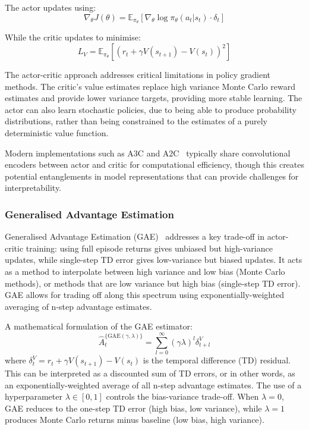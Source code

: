 The actor updates using:
\[
\nabla_\theta J(\theta) = \mathbb{E}_{\pi_\theta}[\nabla_\theta \log \pi_\theta(a_t|s_t) \cdot \delta_t]
\]

While the critic updates to minimise:
\[
L_V = \mathbb{E}_{\pi_\theta}[(r_t + \gamma V(s_{t+1}) - V(s_t))^2]
\]

The actor-critic approach addresses critical limitations in policy gradient methods. The critic's value estimates replace high variance Monte Carlo reward estimates and provide lower variance targets, providing more stable learning. The actor can also learn stochastic policies, due to being able to produce probability distributions, rather than being constrained to the estimates of a purely deterministic value function.

Modern implementations such as A3C and A2C~\citep{mnih_2016_asynchronous} typically share convolutional encoders between actor and critic for computational efficiency, though this creates potential entanglements in model representations that can provide challenges for interpretability.


\subsubsection{Generalised Advantage Estimation}\label{subsubsec:gae}
Generalised Advantage Estimation (GAE)~\citep{schulman_2018_highdimensional} addresses a key trade-off in actor-critic training: using full episode returns gives unbiased but high-variance updates, while single-step TD error gives low-variance but biased updates. It acts as a method to interpolate between high variance and low bias (Monte Carlo methods), or methods that are low variance but high bias (single-step TD error). GAE allows for trading off along this spectrum using exponentially-weighted averaging of n-step advantage estimates.

A mathematical formulation of the GAE estimator:
\[
\hat{A}_t^{\{\text{GAE}(\gamma,\lambda)\}} = \sum_{l=0}^{\infty} (\gamma\lambda)^l \delta_{t+l}^V
\]
where $\delta_t^V = r_t + \gamma V(s_{t+1}) - V(s_t)$ is the temporal difference (TD) residual. This can be interpreted as a discounted sum of TD errors, or in other words, as an exponentially-weighted average of all n-step advantage estimates. The use of a hyperparameter $\lambda \in [0,1]$ controls the bias-variance trade-off. When $\lambda=0$, GAE reduces to the one-step TD error (high bias, low variance), while $\lambda=1$ produces Monte Carlo returns minus baseline (low bias, high variance).

